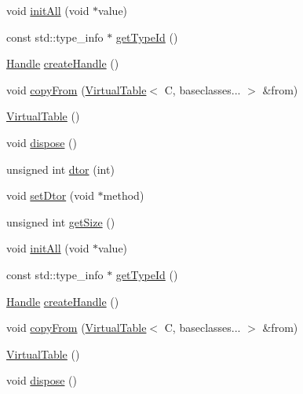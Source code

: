 \begin{DoxyCompactItemize}
void \mbox{\hyperlink{structfakeit_1_1VirtualTable_a261b66b33067b4425791762cb3786f20}{init\+All}} (void $\ast$value)
\item 
const std\+::type\+\_\+info $\ast$ \mbox{\hyperlink{structfakeit_1_1VirtualTable_a5ed35b122d5d06afced80ab93062bfa3}{get\+Type\+Id}} ()
\item 
\mbox{\hyperlink{classfakeit_1_1VirtualTable_1_1Handle}{Handle}} \mbox{\hyperlink{structfakeit_1_1VirtualTable_a616ff0e7567c8c5f368faff1dca949df}{create\+Handle}} ()
\item 
void \mbox{\hyperlink{structfakeit_1_1VirtualTable_a79d7c3b29e6da1ba1974c8c9d69fd7bd}{copy\+From}} (\mbox{\hyperlink{structfakeit_1_1VirtualTable}{Virtual\+Table}}$<$ C, baseclasses... $>$ \&from)
\item 
\mbox{\hyperlink{structfakeit_1_1VirtualTable_ae64da18818c25b107d8f9f2c615c4c37}{Virtual\+Table}} ()
\item 
void \mbox{\hyperlink{structfakeit_1_1VirtualTable_a58c2bfa93deb68aba5eced688c168e66}{dispose}} ()
\item 
unsigned int \mbox{\hyperlink{structfakeit_1_1VirtualTable_a7be0619d713b6ae2cac5722895176a14}{dtor}} (int)
\item 
void \mbox{\hyperlink{structfakeit_1_1VirtualTable_adee13076280ff9bd4c06b5f1e62d6708}{set\+Dtor}} (void $\ast$method)
\item 
unsigned int \mbox{\hyperlink{structfakeit_1_1VirtualTable_a014d48c976f89207564bf8d68b64a039}{get\+Size}} ()
\item 
void \mbox{\hyperlink{structfakeit_1_1VirtualTable_a261b66b33067b4425791762cb3786f20}{init\+All}} (void $\ast$value)
\item 
const std\+::type\+\_\+info $\ast$ \mbox{\hyperlink{structfakeit_1_1VirtualTable_a5ed35b122d5d06afced80ab93062bfa3}{get\+Type\+Id}} ()
\item 
\mbox{\hyperlink{classfakeit_1_1VirtualTable_1_1Handle}{Handle}} \mbox{\hyperlink{structfakeit_1_1VirtualTable_a616ff0e7567c8c5f368faff1dca949df}{create\+Handle}} ()
\item 
void \mbox{\hyperlink{structfakeit_1_1VirtualTable_a79d7c3b29e6da1ba1974c8c9d69fd7bd}{copy\+From}} (\mbox{\hyperlink{structfakeit_1_1VirtualTable}{Virtual\+Table}}$<$ C, baseclasses... $>$ \&from)
\item 
\mbox{\hyperlink{structfakeit_1_1VirtualTable_ae64da18818c25b107d8f9f2c615c4c37}{Virtual\+Table}} ()
\item 
void \mbox{\hyperlink{structfakeit_1_1VirtualTable_a58c2bfa93deb68aba5eced688c168e66}{dispose}} ()

\end{DoxyCompactItemize}
